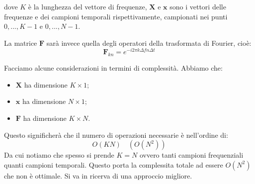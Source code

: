dove $K$ è la lunghezza del vettore di frequenze, $\mathbf{X}$ e $\mathbf{x}$ 
sono i vettori delle frequenze e dei campioni temporali rispettivamente, campionati nei punti 
$0, ..., K - 1$ e $0, ..., N - 1$.

La matrice $\mathbf{F}$ sarà invece quella degli operatori della trasformata di Fourier, cioè:
$$
\mathbf{F}_{kn} = e^{- i 2 \pi k \Delta f n \Delta t}
$$

Facciamo alcune considerazioni in termini di complessità. Abbiamo che:
\begin{itemize}
	\item $\mathbf{X}$ ha dimensione $K \times 1$;
	\item $\mathbf{x}$ ha dimensione $N \times 1$;
	\item $\mathbf{F}$ ha dimensione $K \times N$.
\end{itemize}
Questo significherà che il numero di operazioni necessarie è nell'ordine di:
$$
O(KN) \quad \left( O(N^2) \right)
$$
Da cui notiamo che spesso si prende $K = N$ ovvero tanti campioni frequenziali 
quanti campioni temporali. Questo porta la complessita totale ad essere $O(N^2)$ 
che non è ottimale. Si va in ricerva di una approccio migliore. 

